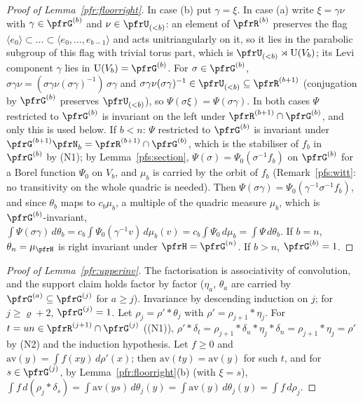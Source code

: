 \documentclass[10pt]{amsart}
\theoremstyle{definition}
\theoremstyle{remark}
\providecommand{\auU}{\mathrm U}
\begin{document}
\begin{proof}[Proof of Lemma~\ref{pfr:floorright}]
In case (b) put $\gamma=\xi$. In case (a) write $\xi=\gamma\nu$ with $\gamma\in\pfrG^{(b)}$ and
$\nu\in\pfrU_{(<b)}$: an element of $\pfrR^{(b)}$ preserves the flag $\langle e_0\rangle\subset\dots\subset\langle
e_0,\dots,e_{b-1}\rangle$ and acts unitriangularly on it, so it lies in the parabolic subgroup of this flag with trivial
torus part, which is $\pfrU_{(<b)}\rtimes\auU(V_b)$; its Levi component $\gamma$ lies in $\auU(V_b)=\pfrG^{(b)}$. For
$\sigma\in\pfrG^{(b)}$, $\sigma\gamma\nu=(\sigma\gamma\nu(\sigma\gamma)^{-1})\,\sigma\gamma$ and $\sigma\gamma\nu(\sigma\gamma)^{-1}\in\pfrU_{(<b)}
\subseteq\pfrR^{(b+1)}$ (conjugation by $\pfrG^{(b)}$ preserves $\pfrU_{(<b)}$), so $\Psi(\sigma\xi)=\Psi(\sigma\gamma)$.
In both cases $\Psi$ restricted to $\pfrG^{(b)}$ is invariant on the left under $\pfrR^{(b+1)}\cap\pfrG^{(b)}$, and
only this is used below.
If $b<n$: $\Psi$ restricted to $\pfrG^{(b)}$ is invariant under $\pfrG^{(b+1)}\pfrN_b=\pfrR^{(b+1)}\cap\pfrG^{(b)}$, which
is the stabiliser of $f_b$ in $\pfrG^{(b)}$ by (N1); by Lemma~\ref{pfs:section}, $\Psi(\sigma)=\Psi_0(\sigma^{-1}f_b)$ on
$\pfrG^{(b)}$ for a Borel function $\Psi_0$ on $V_b$, and $\mu_b$ is carried by the orbit of $f_b$ (Remark~\ref{pfs:witt}:
no transitivity on the whole quadric is needed). Then $\Psi(\sigma\gamma)=\Psi_0(\gamma^{-1}\sigma^{-1}f_b)$, and since
$\theta_b$ maps to $c_b\mu_b$, a multiple of the quadric measure $\mu_b$, which is $\pfrG^{(b)}$-invariant,
$\int\Psi(\sigma\gamma)\,d\theta_b=c_b\int\Psi_0(\gamma^{-1}v)\,d\mu_b(v)=c_b\int\Psi_0\,d\mu_b=\int\Psi\,d\theta_b$. If $b=n$, $\theta_n=\mu_\pfrH$
is right invariant under $\pfrH=\pfrG^{(n)}$. If $b>n$, $\pfrG^{(b)}=1$.
\end{proof}

\begin{proof}[Proof of Lemma~\ref{pfr:upperinv}]
The factorisation is associativity of convolution, and the support claim holds factor by factor ($\eta_a$,
$\theta_a$ are carried by $\pfrG^{(a)}\subseteq\pfrG^{(j)}$ for $a\ge j$). Invariance by descending induction on
$j$; for $j\ge\varrho+2$, $\pfrG^{(j)}=1$. Let $\rho_j=\rho'*\theta_j$ with $\rho'=\rho_{j+1}*\eta_j$. For
$t=un\in\pfrR^{(j+1)}\cap\pfrG^{(j)}$ ((N1)), $\rho'*\delta_t=\rho_{j+1}*\delta_u*\eta_j*\delta_n=\rho_{j+1}*\eta_j=\rho'$
by (N2) and the induction hypothesis. Let $f\ge0$ and $\mathrm{av}(y)=\int f(xy)\,d\rho'(x)$; then $\mathrm{av}(ty)=
\mathrm{av}(y)$ for such $t$, and for $s\in\pfrG^{(j)}$, by Lemma~\ref{pfr:floorright}(b) (with $\xi=s$),
$\int f\,d(\rho_j*\delta_s)=\int\mathrm{av}(ys)\,d\theta_j(y)=\int\mathrm{av}(y)\,d\theta_j(y)=\int f\,d\rho_j$.
\end{proof}
\end{document}
